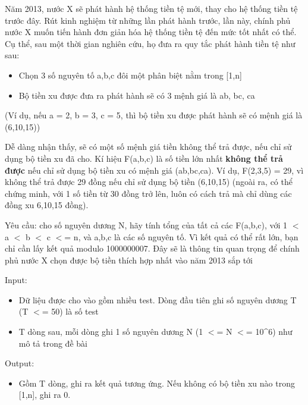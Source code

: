 



    Năm 2013, nước X sẽ phát hành hệ thống tiền tệ mới, thay cho hệ thống tiền tệ trước đây. Rút kinh nghiệm từ những lần phát hành trước, lần này, chính phủ nước X muốn tiến hành đơn giản hóa hệ thống tiền tệ đến mức tốt nhất có thể. Cụ thể, sau một thời gian nghiên cứu, họ đưa ra quy tắc phát hành tiền tệ như sau:   
\begin{itemize}
	\item 

      Chọn  3 số nguyên tố a,b,c đôi một phân biệt nằm trong [1,n]     
	\item 

      Bộ  tiền xu được đưa ra phát hành sẽ có 3 mệnh giá là  ab, bc, ca     
\end{itemize}

    (Ví dụ, nếu a = 2, b = 3, c = 5, thì bộ tiền xu được phát hành sẽ có mệnh giá là (6,10,15))   



    Dễ dàng nhận thấy, sẽ có một số mệnh giá tiền không thể trả được, nếu chỉ sử dụng bộ tiền xu đã cho. Kí hiệu F(a,b,c) là số tiền lớn nhất   \textbf{     không thể trả được    }    nếu chỉ sử dụng bộ tiền xu có mệnh giá (ab,bc,ca). Ví dụ, F(2,3,5) = 29, vì không thể trả được 29 đồng nếu chỉ sử dụng bộ tiền (6,10,15) (ngoài ra, có thể chứng minh, với 1 số tiền từ 30 đồng trở lên, luôn có cách trả mà chỉ dùng các đồng xu 6,10,15 đồng).   



    Yêu cầu: cho số nguyên dương N, hãy tính tổng của tất cả các F(a,b,c), với 1 $<$ a $<$ b $<$ c $<$= n, và a,b,c là các số nguyên tố. Vì kết quả có thể rất lớn, bạn chỉ cần lấy kết quả modulo 1000000007. Đây sẽ là thông tin quan trọng để chính phủ nước X chọn được bộ tiền thích hợp nhất vào năm 2013 sắp tới   



    Input:   
\begin{itemize}
	\item 

      Dữ  liệu được cho vào gồm nhiều test. Dòng đầu tiên ghi  số nguyên dương T (T $<$= 50) là số test     
	\item 

      T  dòng sau, mỗi dòng ghi 1 số nguyên dương N (1 $<$= N $<$=  10\textasciicircum6) như mô tả trong đề bài     
\end{itemize}

    Output:   
\begin{itemize}
	\item 

      Gồm  T dòng, ghi ra kết quả tương ứng. Nếu không có bộ  tiền xu nào trong [1,n], ghi ra 0.     
\end{itemize}



